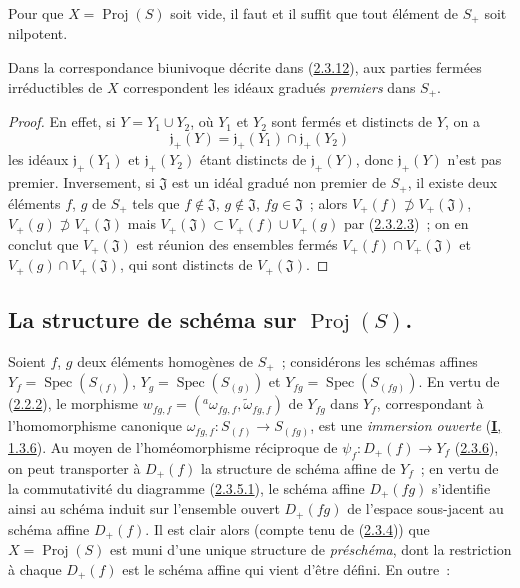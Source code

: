 \begin{corollary}[2.3.16]
\label{II.2.3.16-fr}
Pour que $X=\operatorname{Proj}(S)$ soit vide, il faut et il suffit que tout
élément de $S_+$ soit nilpotent.
\end{corollary}

\begin{corollary}[2.3.17]
\label{II.2.3.17-fr}
Dans la correspondance biunivoque décrite dans
\textup{(\hyperref[II.2.3.12-fr]{2.3.12})}, aux parties fermées irréductibles de $X$
correspondent les idéaux gradués \emph{premiers} dans $S_+$.
\end{corollary}

\begin{proof}
En effet, si $Y=Y_1\cup Y_2$, où $Y_1$ et $Y_2$ sont fermés et distincts de
$Y$, on a
\[
  \mathfrak{j}_+(Y)
  =\mathfrak{j}_+(Y_1)\cap\mathfrak{j}_+(Y_2)
\]
les idéaux $\mathfrak{j}_+(Y_1)$ et $\mathfrak{j}_+(Y_2)$ étant distincts
de $\mathfrak{j}_+(Y)$, donc $\mathfrak{j}_+(Y)$ n'est pas premier.
Inversement, si $\mathfrak{J}$ est un idéal gradué non premier de $S_+$, il
existe deux éléments $f$, $g$ de $S_+$ tels que
$f\notin\mathfrak{J}$, $g\notin\mathfrak{J}$, $fg\in\mathfrak{J}$~; alors
$V_+(f)\not\supset V_+(\mathfrak{J})$,
$V_+(g)\not\supset V_+(\mathfrak{J})$ mais
$V_+(\mathfrak{J})\subset V_+(f)\cup V_+(g)$ par
(\hyperref[II.2.3.2.3-fr]{2.3.2.3})~; on en conclut que
$V_+(\mathfrak{J})$ est réunion des ensembles fermés
$V_+(f)\cap V_+(\mathfrak{J})$ et $V_+(g)\cap V_+(\mathfrak{J})$, qui sont
distincts de $V_+(\mathfrak{J})$.
\end{proof}

\subsection{La structure de schéma sur $\operatorname{Proj}(S)$.}
\label{subsection:II.2.4-fr}

\begin{env}[2.4.1]
\label{II.2.4.1-fr}
Soient $f$, $g$ deux éléments homogènes de $S_+$~; considérons les schémas
affines $Y_f=\operatorname{Spec}(S_{(f)})$,
$Y_g=\operatorname{Spec}(S_{(g)})$ et
$Y_{fg}=\operatorname{Spec}(S_{(fg)})$. En vertu de
(\hyperref[II.2.2.2-fr]{2.2.2}), le morphisme
$w_{fg,f}=({}^a\omega_{fg,f},\widetilde{\omega}_{fg,f})$ de $Y_{fg}$ dans
$Y_f$, correspondant à l'homomorphisme canonique
$\omega_{fg,f}:S_{(f)}\to S_{(fg)}$, est une \emph{immersion ouverte}
(\hyperref[I.1.3.6-fr]{\textbf{I}, 1.3.6}). Au moyen de l'homéomorphisme réciproque
de $\psi_f:D_+(f)\to Y_f$ (\hyperref[II.2.3.6-fr]{2.3.6}), on peut
transporter à $D_+(f)$ la structure de schéma affine de $Y_f$~; en vertu de
la commutativité du diagramme (\hyperref[II.2.3.5.1-fr]{2.3.5.1}), le
schéma affine $D_+(fg)$ s'identifie ainsi au schéma induit sur l'ensemble
ouvert $D_+(fg)$ de l'espace sous-jacent au schéma affine $D_+(f)$. Il est
clair alors (compte tenu de (\hyperref[II.2.3.4-fr]{2.3.4})) que
$X=\operatorname{Proj}(S)$ est muni d'une unique structure de
\emph{préschéma}, dont la restriction à chaque $D_+(f)$ est le schéma
affine qui vient d'être défini. En outre~:
\end{env}

